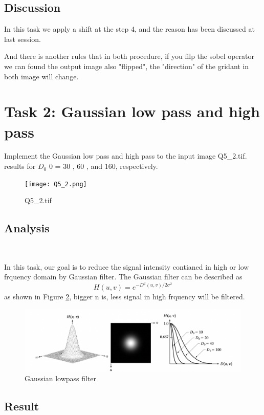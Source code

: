 \documentclass[
	12pt, %
]{style/fphw}
\begin{document}
\subsection*{Discussion}

In this task we apply a shift at the step 4, and the reason has been discussed at last session.

And there is another rules that in both procedure, if you filp the sobel operator we can found the output image also "flipped", the "direction" of the gridant in both image will change.

\newpage
\section*{Task 2: Gaussian low pass and high pass}

\begin{problem}
Implement the Gaussian low pass and high pass to the input image Q5\_2.tif. results for $D_0$ 0 = 30 , 60 , and 160, respectively.

\begin{figure}[H]
    \centering
    \texttt{[image: Q5\_2.png]}
    \caption{Q5\_2.tif}
    \label{Q5_2.tif}
\end{figure}
\end{problem}

\subsection*{Analysis} \

In this task, our goal is to reduce the signal intensity contianed in high or low frquency domain by Gaussian filter. The Gaussian filter can be described as $$H(u,v)=e^{-D^2(u,v)/2\sigma^2}$$ as shown in Figure \ref{Gaussian.png}, bigger n is, less signal in high frquency will be filtered.

\begin{figure}[H]
    \centering
    \includegraphics[width=0.8\linewidth]{chart/Gaussian.png}
    \caption{Gaussian lowpass filter}
    \label{Gaussian.png}
\end{figure}

\subsection*{Result} \
\end{document}
